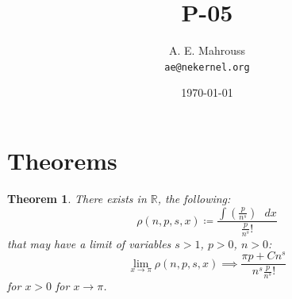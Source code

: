 \documentclass[11pt, a4paper]{article}
\title{P-05}
\author{A. E. Mahrouss\\\texttt{ae@nekernel.org}}
\date{\today}
\theoremstyle{plain}
\newtheorem{theorem}{Theorem}[section]
\theoremstyle{definition}
\theoremstyle{remark}
\begin{document}
\twocolumn[{%
  \maketitle
  \vspace{-0.5em}
  \vspace{0.8em}
  \rule{\linewidth}{0.4pt}
  \vspace{1em}
}]

\maketitle

\section{Theorems}
\begin{theorem}
There exists in $\mathbb{R}$, the following:
\begin{equation}
\rho(n, p, s, x) \coloneq \frac{\int (\frac{p}{n^{s}}) \text{ } dx}{\frac{p}{n^{s}}! }
\end{equation}
that may have a limit of variables $s>1$, $p>0$, $n>0$:
\begin{equation}
  \lim_{x \to \pi} \rho(n, p, s, x) \implies \frac{\pi p+Cn^s}{n^s\frac{p}{n^s}!}
\end{equation}
for $x > 0$ for $x \to \pi$. 
\end{theorem}
\end{document}
